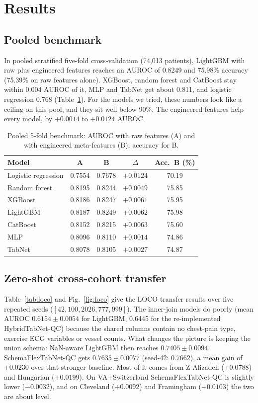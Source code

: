 \documentclass[conference]{IEEEtran}
\newcommand{\sfn}{SchemaFlexTabNet-QC}
\newcommand{\htn}{HybridTabNet-QC}
\begin{document}
\section{Results}\label{sec:results}
\subsection{Pooled benchmark}\label{sec:pooled}
In pooled stratified five-fold cross-validation (74{,}013 patients), LightGBM with raw plus engineered features reaches an AUROC of 0.8249 and 75.98\% accuracy (75.39\% on raw features alone). XGBoost, random forest and CatBoost stay within 0.004 AUROC of it, MLP and TabNet get about 0.811, and logistic regression 0.768 (Table~\ref{tab:pooled}). For the models we tried, these numbers look like a ceiling on this pool, and they sit well below 90\%. The engineered features help every model, by $+0.0014$ to $+0.0124$ AUROC.

\begin{table}[t]
\caption{Pooled 5-fold benchmark: AUROC with raw features (A) and with engineered meta-features (B); accuracy for B.}
\label{tab:pooled}
\centering\footnotesize
\begin{tabular}{lcccc}
\toprule
Model & A & B & $\Delta$ & Acc.\ B (\%)\\
\midrule
Logistic regression & 0.7554 & 0.7678 & $+0.0124$ & 70.19\\
Random forest & 0.8195 & 0.8244 & $+0.0049$ & 75.85\\
XGBoost & 0.8186 & 0.8247 & $+0.0061$ & 75.95\\
LightGBM & 0.8187 & 0.8249 & $+0.0062$ & 75.98\\
CatBoost & 0.8152 & 0.8215 & $+0.0063$ & 75.60\\
MLP & 0.8096 & 0.8110 & $+0.0014$ & 74.86\\
TabNet & 0.8078 & 0.8105 & $+0.0027$ & 74.87\\
\bottomrule
\end{tabular}
\end{table}

\subsection{Zero-shot cross-cohort transfer}
Table~\ref{tab:loco} and Fig.~\ref{fig:loco} give the LOCO transfer results over five repeated seeds ($[42, 100, 2026, 777, 999]$). The inner-join models do poorly (mean AUROC $0.6154 \pm 0.0054$ for LightGBM, 0.6445 for the re-implemented \htn{}) because the shared columns contain no chest-pain type, exercise ECG variables or vessel counts. What changes the picture is keeping the union schema: NaN-aware LightGBM then reaches $0.7405 \pm 0.0094$. \sfn{} gets $0.7635 \pm 0.0077$ (seed-42: 0.7662), a mean gain of $+0.0230$ over that stronger baseline. Most of it comes from Z-Alizadeh ($+0.0788$) and Hungarian ($+0.0199$). On VA+Switzerland \sfn{} is slightly lower ($-0.0032$), and on Cleveland ($+0.0092$) and Framingham ($+0.0103$) the two are about level.
\end{document}
